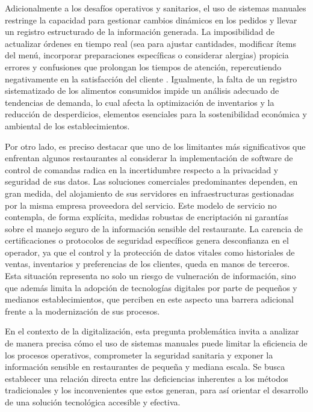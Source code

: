 Adicionalmente a los desafíos operativos y sanitarios, el uso de sistemas manuales restringe la capacidad para gestionar cambios dinámicos en los pedidos y llevar un registro estructurado de la información generada. La imposibilidad de actualizar órdenes en tiempo real (sea para ajustar cantidades, modificar ítems del menú, incorporar preparaciones específicas o considerar alergias) propicia errores y confusiones que prolongan los tiempos de atención, repercutiendo negativamente en la satisfacción del cliente \cite{Ser2024Estrategia}. Igualmente, la falta de un registro sistematizado de los alimentos consumidos impide un análisis adecuado de tendencias de demanda, lo cual afecta la optimización de inventarios y la reducción de desperdicios, elementos esenciales para la sostenibilidad económica y ambiental de los establecimientos.

Por otro lado, es preciso destacar que uno de los limitantes más significativos que enfrentan algunos restaurantes al considerar la implementación de software de control de comandas radica en la incertidumbre respecto a la privacidad y seguridad de sus datos. Las soluciones comerciales predominantes dependen, en gran medida, del alojamiento de sus servidores en infraestructuras gestionadas por la misma empresa proveedora del servicio. Este modelo de servicio no contempla, de forma explícita, medidas robustas de encriptación ni garantías sobre el manejo seguro de la información sensible del restaurante. La carencia de certificaciones o protocolos de seguridad específicos genera desconfianza en el operador, ya que el control y la protección de datos vitales como historiales de ventas, inventarios y preferencias de los clientes, queda en manos de terceros. Esta situación representa no solo un riesgo de vulneración de información, sino que además limita la adopción de tecnologías digitales por parte de pequeños y medianos establecimientos, que perciben en este aspecto una barrera adicional frente a la modernización de sus procesos.

En el contexto de la digitalización, esta pregunta problemática invita a analizar de manera precisa cómo el uso de sistemas manuales puede limitar la eficiencia de los procesos operativos, comprometer la seguridad sanitaria y exponer la información sensible en restaurantes de pequeña y mediana escala. Se busca establecer una relación directa entre las deficiencias inherentes a los métodos tradicionales y los inconvenientes que estos generan, para así orientar el desarrollo de una solución tecnológica accesible y efectiva.



